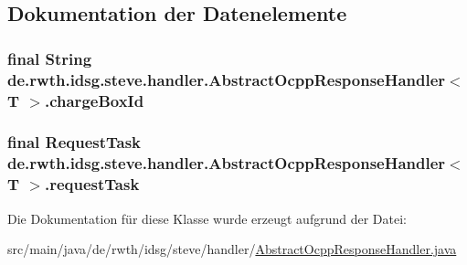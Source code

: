 \subsection{Dokumentation der Datenelemente}
\hypertarget{classde_1_1rwth_1_1idsg_1_1steve_1_1handler_1_1_abstract_ocpp_response_handler_3_01_t_01_4_a8c07bdb598803efe236906c96a8d21a6}{
\subsubsection[{charge\+Box\+Id}]{\setlength{\rightskip}{0pt plus 5cm}final String de.\+rwth.\+idsg.\+steve.\+handler.\+Abstract\+Ocpp\+Response\+Handler$<$ T $>$.charge\+Box\+Id\hspace{0.3cm}{\ttfamily [protected]}}}\label{classde_1_1rwth_1_1idsg_1_1steve_1_1handler_1_1_abstract_ocpp_response_handler_3_01_t_01_4_a8c07bdb598803efe236906c96a8d21a6}
\hypertarget{classde_1_1rwth_1_1idsg_1_1steve_1_1handler_1_1_abstract_ocpp_response_handler_3_01_t_01_4_afbad6820ded6580e25792d7a4b893465}{
\subsubsection[{request\+Task}]{\setlength{\rightskip}{0pt plus 5cm}final {\bf Request\+Task} de.\+rwth.\+idsg.\+steve.\+handler.\+Abstract\+Ocpp\+Response\+Handler$<$ T $>$.request\+Task\hspace{0.3cm}{\ttfamily [protected]}}}\label{classde_1_1rwth_1_1idsg_1_1steve_1_1handler_1_1_abstract_ocpp_response_handler_3_01_t_01_4_afbad6820ded6580e25792d7a4b893465}


Die Dokumentation für diese Klasse wurde erzeugt aufgrund der Datei\+:\begin{DoxyCompactItemize}
\item 
src/main/java/de/rwth/idsg/steve/handler/\hyperlink{_abstract_ocpp_response_handler_8java}{Abstract\+Ocpp\+Response\+Handler.\+java}\end{DoxyCompactItemize}
